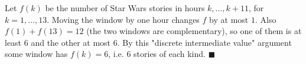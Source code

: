 Let $f(k)$ be the number of Star Wars stories in hours $k,\dots,k+11$, for $k=1,\dots,13$. Moving the window by one hour changes $f$ by at most $1$. Also $f(1)+f(13)=12$ (the two windows are complementary), so one of them is at least $6$ and the other at most $6$. By this "discrete intermediate value" argument some window has $f(k)=6$, i.e. $6$ stories of each kind. $\blacksquare$
